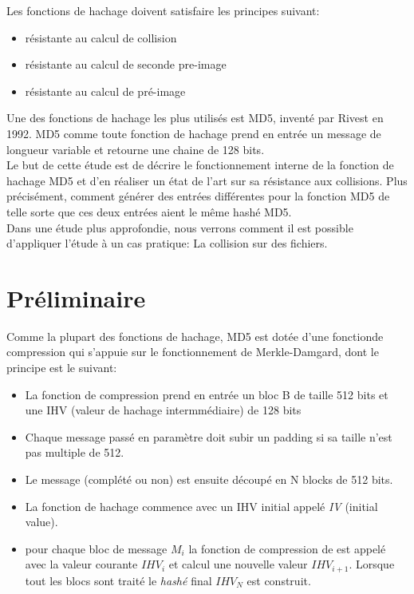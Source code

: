 \documentclass[a4paper,11pt,french]{article}
\begin{document}
Les fonctions de hachage doivent satisfaire les principes suivant:
\begin{itemize}
  \item résistante au calcul de collision
  \item résistante au calcul de seconde pre-image
  \item résistante au calcul de pré-image
\end{itemize}
\vspace{.5cm}

Une des fonctions de hachage les plus utilisés est MD5, inventé par Rivest en 1992. MD5 comme toute fonction de hachage prend en entrée un message de longueur variable et retourne une chaine de 128 bits.\\

Le but de cette étude est de décrire le fonctionnement interne de la fonction de hachage MD5 et d'en réaliser un état de l'art sur sa résistance aux collisions. Plus précisément, comment générer des entrées différentes pour la fonction MD5 de telle sorte que ces deux entrées aient le même hashé MD5.\\
Dans une étude plus approfondie, nous verrons comment il est possible d'appliquer l'étude à un cas pratique: La collision sur des fichiers.\\


\section{Préliminaire}
Comme la plupart des fonctions de hachage, MD5 est dotée d'une fonctionde compression qui s'appuie sur le fonctionnement de Merkle-Damgard, dont le principe est le suivant:\\
\begin{itemize}
\item La fonction de compression prend en entrée un bloc B de taille 512 bits et une IHV (valeur de hachage intermmédiaire) de 128 bits
\item Chaque message passé en paramètre doit subir un padding si sa taille n'est pas multiple de 512.
\item Le message (complété ou non) est ensuite découpé en N blocks de 512 bits.
\item La fonction de hachage commence avec un IHV initial appelé {\it{IV}} (initial value).
\item pour chaque bloc de message $M_{i}$ la fonction de compression de est appelé avec la valeur courante $IHV_{i}$ et calcul une nouvelle valeur $IHV_{i+1}$. Lorsque tout les blocs sont traité le {\it{hashé}} final $IHV_{N}$ est construit.
\end{itemize}
\vspace{.5cm}
\end{document}
